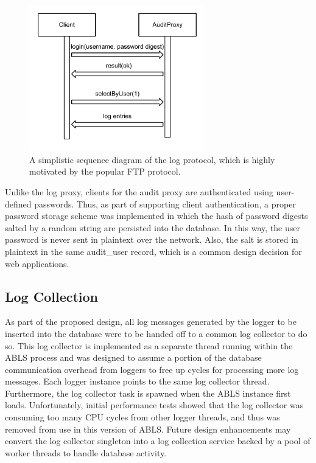 \documentclass{sig-alternate}
\begin{document}
\begin{figure}[ht!]
\begin{center}
\includegraphics[width=3in]{images/logProtocol.pdf}
\caption{A simplistic sequence diagram of the log protocol, which is highly motivated by the popular FTP protocol.}
\label{fig:protocol}
\end{center}
\end{figure}

Unlike the log proxy, clients for the audit proxy are authenticated using user-defined passwords. Thus, as
part of supporting client authentication, a proper password storage scheme was implemented in which the hash of 
password digests salted by a random string are persisted into the database. In this way, the user password is never sent 
in plaintext over the network. Also, the salt is stored in plaintext in the same audit\_user record, which is a common
design decision for web applications.

\subsection{Log Collection}
As part of the proposed design, all log messages generated by the logger to be inserted into the 
database were to be handed off to a common log collector to do so. This log collector is implemented as a 
separate thread running within the ABLS process and was designed to assume a portion of the database 
communication overhead from loggers to free up cycles for processing more log messages. Each logger instance
points to the same log collector thread. Furthermore, the log collector task is spawned when the ABLS 
instance first loads. Unfortunately, initial performance tests showed that the log collector was consuming too
many CPU cycles from other logger threads, and thus was removed from use in this version of ABLS. 
Future design enhancements may convert the log collector singleton into a log collection service backed 
by a pool of worker threads to handle database activity. 
\end{document}
